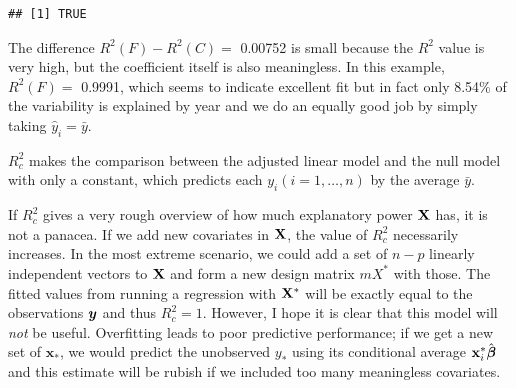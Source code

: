 \documentclass[]{book}
\newenvironment{Shaded}{\begin{snugshade}}{\end{snugshade}}
\newcommand{\KeywordTok}[1]{\textcolor[rgb]{0.13,0.29,0.53}{\textbf{#1}}}
\newcommand{\DecValTok}[1]{\textcolor[rgb]{0.00,0.00,0.81}{#1}}
\newcommand{\StringTok}[1]{\textcolor[rgb]{0.31,0.60,0.02}{#1}}
\newcommand{\CommentTok}[1]{\textcolor[rgb]{0.56,0.35,0.01}{\textit{#1}}}
\newcommand{\OperatorTok}[1]{\textcolor[rgb]{0.81,0.36,0.00}{\textbf{#1}}}
\newcommand{\NormalTok}[1]{#1}
\theoremstyle{definition}
\theoremstyle{definition}
\theoremstyle{definition}
\theoremstyle{remark}
\begin{document}
\begin{Shaded}
\end{Shaded}

\begin{verbatim}
## [1] TRUE
\end{verbatim}

The difference \(R^2(F)-R^2(C)=\) 0.00752 is small because the \(R^2\)
value is very high, but the coefficient itself is also meaningless. In
this example, \(R^2(F)=\) 0.9991, which seems to indicate excellent fit
but in fact only 8.54\% of the variability is explained by year and we
do an equally good job by simply taking \(\hat{y}_i=\bar{y}\).

\(R^2_c\) makes the comparison between the adjusted linear model and the
null model with only a constant, which predicts each
\(y_i (i=1, \ldots, n)\) by the average \(\bar{y}\).

If \(R^2_c\) gives a very rough overview of how much explanatory power
\(\mathbf{X}\) has, it is not a panacea. If we add new covariates in \(\mathbf{X}\),
the value of \(R^2_c\) necessarily increases. In the most extreme
scenario, we could add a set of \(n-p\) linearly independent vectors to
\(\mathbf{X}\) and form a new design matrix \(mX^*\) with those. The fitted
values from running a regression with \(\mathbf{X}^*\) will be exactly equal to
the observations \(\boldsymbol{y}\) and thus \(R^2_c=1\). However, I hope it is
clear that this model will \emph{not} be useful. Overfitting leads to
poor predictive performance; if we get a new set of \(\mathbf{x}_*\), we
would predict the unobserved \(y_*\) using its conditional average
\(\mathbf{x}_i^*\hat{\boldsymbol{\beta}}\) and this estimate will be rubish if we included
too many meaningless covariates.
\end{document}
